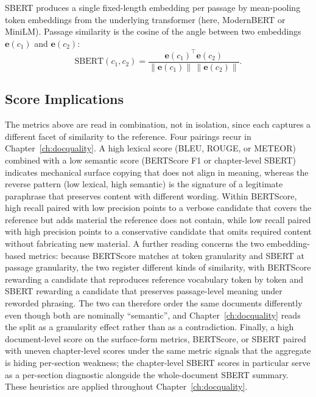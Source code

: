 SBERT produces a single fixed-length embedding per passage by mean-pooling token embeddings from the underlying transformer (here, ModernBERT or MiniLM). Passage similarity is the cosine of the angle between two embeddings $\mathbf{e}(c_1)$ and $\mathbf{e}(c_2)$:
\begin{equation}
\label{eq:sbert}
\mathrm{SBERT}(c_1, c_2) = \frac{\mathbf{e}(c_1)^{\top} \mathbf{e}(c_2)}{\| \mathbf{e}(c_1) \| \, \| \mathbf{e}(c_2) \|}.
\end{equation}

\subsection{Score Implications}
\label{ssec:score-implications}

The metrics above are read in combination, not in isolation, since each captures a different facet of similarity to the reference. Four pairings recur in Chapter~\ref{ch:docquality}. A high lexical score (BLEU, ROUGE, or METEOR) combined with a low semantic score (BERTScore F1 or chapter-level SBERT) indicates mechanical surface copying that does not align in meaning, whereas the reverse pattern (low lexical, high semantic) is the signature of a legitimate paraphrase that preserves content with different wording. Within BERTScore, high recall paired with low precision points to a verbose candidate that covers the reference but adds material the reference does not contain, while low recall paired with high precision points to a conservative candidate that omits required content without fabricating new material. A further reading concerns the two embedding-based metrics: because BERTScore matches at token granularity and SBERT at passage granularity, the two register different kinds of similarity, with BERTScore rewarding a candidate that reproduces reference vocabulary token by token and SBERT rewarding a candidate that preserves passage-level meaning under reworded phrasing. The two can therefore order the same documents differently even though both are nominally ``semantic'', and Chapter~\ref{ch:docquality} reads the split as a granularity effect rather than as a contradiction. Finally, a high document-level score on the surface-form metrics, BERTScore, or SBERT paired with uneven chapter-level scores under the same metric signals that the aggregate is hiding per-section weakness; the chapter-level SBERT scores in particular serve as a per-section diagnostic alongside the whole-document SBERT summary. These heuristics are applied throughout Chapter~\ref{ch:docquality}.


